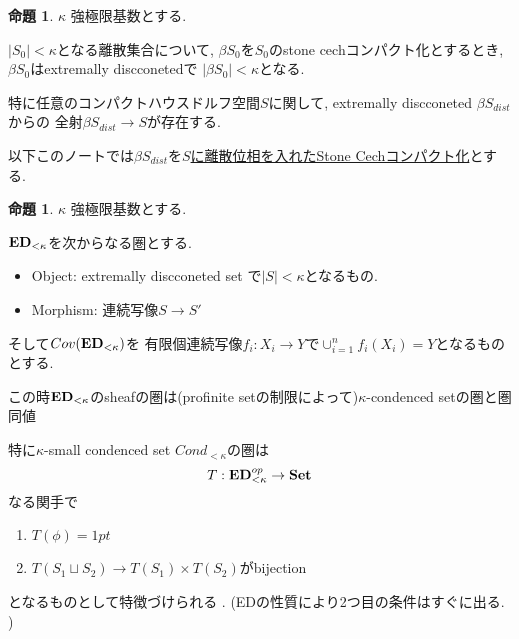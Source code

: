 \documentclass[dvipdfmx,a4paper,11pt]{report}
\theoremstyle{definition}
\newtheorem{prop}[thm]{命題}
\begin{document}
   \begin{tcolorbox}
 [colback = white, colframe = green!35!black, fonttitle = \bfseries,breakable = true]
\begin{prop}\cite[Example 2.5]{Sch19}
\label{prop-sch-exa2.5}
$\kappa$ 強極限基数とする.

$|S_0| <\kappa$となる離散集合について, 
$\beta S_0$を$S_0$のstone cechコンパクト化とするとき,
 $\beta S_0$はextremally discconetedで
$|\beta S_0 | < \kappa$となる.

特に任意のコンパクトハウスドルフ空間$S$に関して, extremally discconeted $\beta S_{dist}$からの
全射$\beta S_{dist} \to S$が存在する. 

 \end{prop}
 \end{tcolorbox}
 
 以下このノートでは$\beta S_{dist}$を\underline{$S$に離散位相を入れたStone Cechコンパクト化}とする. 
 
   \begin{tcolorbox}
 [colback = white, colframe = green!35!black, fonttitle = \bfseries,breakable = true]
\begin{prop}\cite[Example 2.5]{Sch19}
$\kappa$ 強極限基数とする.

${\bf ED}_{< \kappa}$を次からなる圏とする.
\begin{itemize}
\item Object: extremally discconeted set で$|S| < \kappa$となるもの. 
\item Morphism: 連続写像$S \to S'$
\end{itemize}

そして$Cov({\bf ED}_{< \kappa})$を
有限個連続写像$f_i : X_i \to Y$で$\cup_{i=1}^{n}f_i(X_i) =Y$となるものとする. 

この時${\bf ED}_{< \kappa}$のsheafの圏は(profinite setの制限によって)$\kappa$-condenced setの圏と圏同値
 \end{prop}
 \end{tcolorbox}
 
特に$\kappa$-small condenced set $Cond_{<\kappa}$の圏は
$$
T : {\bf ED}_{< \kappa}^{op} \to {\bf Set}
$$
なる関手で
\begin{enumerate}
\item $T(\phi) = 1pt$
\item $T(S_1 \sqcup S_2) \to T(S_1) \times T(S_2)$がbijection
\end{enumerate}
となるものとして特徴づけられる .
(EDの性質により2つ目の条件はすぐに出る. )
\end{document}
